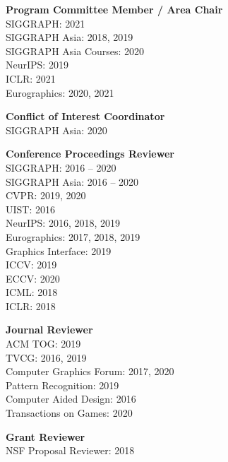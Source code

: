 \documentclass[line,margin]{res}
\begin{document}
\begin{resume}
\textbf{Program Committee Member / Area Chair}\\
SIGGRAPH: 2021\\
SIGGRAPH Asia: 2018, 2019\\
SIGGRAPH Asia Courses: 2020\\
NeurIPS: 2019\\
ICLR: 2021\\
Eurographics: 2020, 2021

\textbf{Conflict of Interest Coordinator}\\
SIGGRAPH Asia: 2020

\textbf{Conference Proceedings Reviewer}\\
SIGGRAPH: 2016 -- 2020\\
SIGGRAPH Asia: 2016 -- 2020\\
CVPR: 2019, 2020\\
UIST: 2016\\
NeurIPS: 2016, 2018, 2019\\
Eurographics: 2017, 2018, 2019\\
Graphics Interface: 2019\\
ICCV: 2019\\
ECCV: 2020\\
ICML: 2018\\
ICLR: 2018

\textbf{Journal Reviewer}\\
ACM TOG: 2019\\
TVCG: 2016, 2019\\
Computer Graphics Forum: 2017, 2020\\
Pattern Recognition: 2019\\
Computer Aided Design: 2016\\
Transactions on Games: 2020

\textbf{Grant Reviewer}\\
NSF Proposal Reviewer: 2018







\end{resume}
\end{document}
